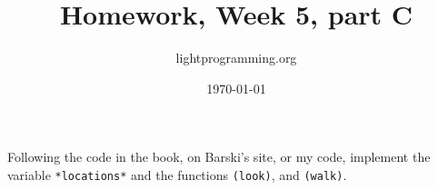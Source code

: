 \documentclass{article}
\title{Homework, Week 5, part C}
\author{lightprogramming.org}
\date{\today}
\begin{document}
\maketitle{}

Following the code in the book, on Barski's site, or my code, implement the variable \texttt{*locations*} and the functions \texttt{(look)}, and \texttt{(walk)}.
\end{document}
